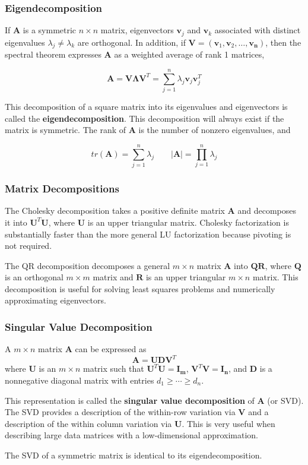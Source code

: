 \documentclass{beamer}
\begin{document}
\begin{frame}
\frametitle{Eigendecomposition}
If  $\mathbf{A}$ is a symmetric $n \times n$ matrix, eigenvectors $\mathbf{v}_j$ and $\mathbf{v}_k$ associated with distinct eigenvalues $\lambda_j \neq \lambda_k$ are orthogonal.  In addition, if $\mathbf{V} = (\mathbf{v}_1, \mathbf{v}_2, \hdots, \mathbf{v_n})$, then the spectral theorem expresses $\mathbf{A}$ as a weighted average of rank 1 matrices,

\[\mathbf{A} = \mathbf{V\Lambda V}^T = \sum_{j=1}^n \lambda_j \mathbf{v}_j \mathbf{v}_j ^T\]

This decomposition of a square matrix into its eigenvalues and eigenvectors is called the \textbf{eigendecomposition}.  This decomposition will always exist if the matrix is symmetric.  The rank of $\mathbf{A}$ is the number of nonzero eigenvalues, and

\[tr(\mathbf{A}) = \sum_{j = 1}^n \lambda_j \qquad |\mathbf{A}| = \prod_{j=1}^n \lambda_j \]

\end{frame}

\begin{frame}
\frametitle{Matrix Decompositions}
The Cholesky decomposition takes a positive definite matrix $\mathbf{A}$ and decomposes it into $\mathbf{U}^T\mathbf{U}$, where $\mathbf{U}$ is an upper triangular matrix.  Cholesky factorization is substantially faster than the more general LU factorization because pivoting is not required.  

\vspace{5mm}

The QR decomposition decomposes a general $m \times n$ matrix $\mathbf{A}$ into $\mathbf{QR}$, where $\mathbf{Q}$ is an orthogonal $m \times m$ matrix and $\mathbf{R}$ is an upper triangular $m \times n$ matrix.  This decomposition is useful for solving least squares problems and numerically approximating eigenvectors. 
\end{frame}

\begin{frame}
\frametitle{Singular Value Decomposition}
A $m \times n$ matrix $\mathbf{A}$ can be expressed as
$$\mathbf{A} = \mathbf{UDV}^T$$ where $\mathbf{U}$ is an $m \times n$ matrix such that $\mathbf{U}^T\mathbf{U} = \mathbf{I_m}$, $\mathbf{V}^T\mathbf{V} = \mathbf{I_n}$, and $\mathbf{D}$ is a nonnegative diagonal matrix with entries $d_1 \geq \cdots \geq d_n$.
\vspace{5mm}

This representation is called the \textbf{singular value decomposition} of $\mathbf{A}$ (or SVD).  The SVD provides a description of the within-row variation via $\mathbf{V}$ and a description of the within column variation via $\mathbf{U}$.  This is very useful when describing large data matrices with a low-dimensional approximation.

\vspace{5mm}

The SVD of a symmetric matrix is identical to its eigendecomposition.
\end{frame}
\end{document}
